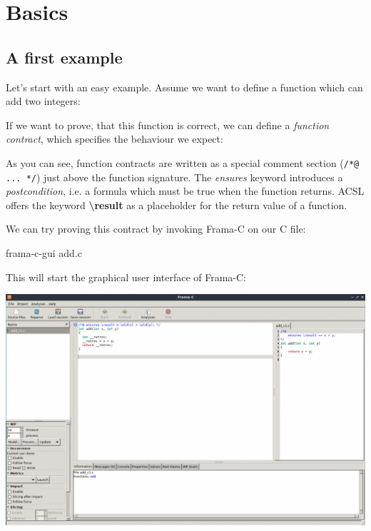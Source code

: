 \chapter{Basics}

\section{A first example}

Let's start with an easy example. Assume we want to define a function which can add two integers:


If we want to prove, that this function is correct, we can define a \emph{function contract}, which specifies the behaviour we expect:


As you can see, function contracts are written as a special comment section  (\texttt{/*@ ... */}) just above the function signature. The \emph{ensures} keyword introduces a \emph{postcondition}, i.e. a formula which must be true when the function returns. ACSL offers the keyword \textbf{\textbackslash result} as a placeholder for the return value of a function. 

We can try proving this contract by invoking Frama-C on our C file:

\begin{ubuntu}
frama-c-gui add.c
\end{ubuntu}

This will start the graphical user interface of Frama-C:

\begin{center}
\includegraphics[width=\textwidth]{images/frama_c_add_c1.png}
\end{center}


